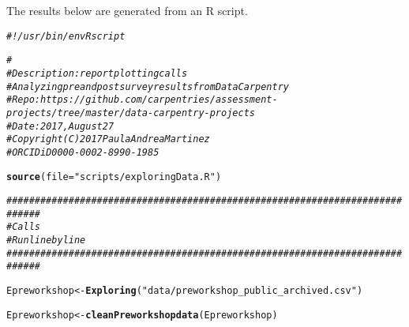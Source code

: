 \documentclass{article}\usepackage[]{graphicx}\usepackage[]{color}
\makeatletter
\newcommand{\hlstr}[1]{\textcolor[rgb]{0.192,0.494,0.8}{#1}}%
\newcommand{\hlcom}[1]{\textcolor[rgb]{0.678,0.584,0.686}{\textit{#1}}}%
\newcommand{\hlstd}[1]{\textcolor[rgb]{0.345,0.345,0.345}{#1}}%
\newcommand{\hlkwb}[1]{\textcolor[rgb]{0.69,0.353,0.396}{#1}}%
\newcommand{\hlkwc}[1]{\textcolor[rgb]{0.333,0.667,0.333}{#1}}%
\newcommand{\hlkwd}[1]{\textcolor[rgb]{0.737,0.353,0.396}{\textbf{#1}}}%
\newenvironment{kframe}{%
 \def\at@end@of@kframe{}%
 \ifinner\ifhmode%
  \def\at@end@of@kframe{\end{minipage}}%
  \begin{minipage}{\columnwidth}%
 \fi\fi%
 \def\FrameCommand##1{\hskip\@totalleftmargin \hskip-\fboxsep
 \colorbox{shadecolor}{##1}\hskip-\fboxsep
     \hskip-\linewidth \hskip-\@totalleftmargin \hskip\columnwidth}%
 \MakeFramed {\advance\hsize-\width
   \@totalleftmargin\z@ \linewidth\hsize
   \@setminipage}}%
 {\par\unskip\endMakeFramed%
 \at@end@of@kframe}
\newenvironment{knitrout}{}{} %
\makeatother
\begin{document}
The results below are generated from an R script.

\begin{knitrout}
\color{fgcolor}\begin{kframe}
\begin{alltt}
\hlcom{#! /usr/bin/env Rscript}

\hlcom{#}
\hlcom{#   Description: report plotting calls}
\hlcom{#   Analyzing pre and post survey results from Data Carpentry }
\hlcom{#   Repo: https://github.com/carpentries/assessment-projects/tree/master/data-carpentry-projects}
\hlcom{#   Date: 2017, August 27}
\hlcom{#   Copyright (C) 2017 Paula Andrea Martinez}
\hlcom{#   ORCID iD 0000-0002-8990-1985}

\hlkwd{source}\hlstd{(}\hlkwc{file} \hlstd{=} \hlstr{"scripts/exploringData.R"}\hlstd{)}
\end{alltt}


{\ttfamily\noindent{}}

{\ttfamily\noindent\bfseries{}}\begin{alltt}
\hlcom{# ###########################################################################}
\hlcom{# Calls }
\hlcom{# Run line by line}
\hlcom{# ###########################################################################}
\end{alltt}
\end{kframe}
\end{knitrout}
\begin{knitrout}
\color{fgcolor}\begin{kframe}
\begin{alltt}
\hlstd{Epreworkshop} \hlkwb{<-} \hlkwd{Exploring}\hlstd{(}\hlstr{"data/preworkshop_public_archived.csv"}\hlstd{)}
\end{alltt}


{\ttfamily\noindent\bfseries{}}\begin{alltt}
\hlstd{Epreworkshop} \hlkwb{<-} \hlkwd{cleanPreworkshopdata}\hlstd{(Epreworkshop)}
\end{alltt}


{\ttfamily\noindent\bfseries{}}\end{kframe}
\end{knitrout}
\end{document}
